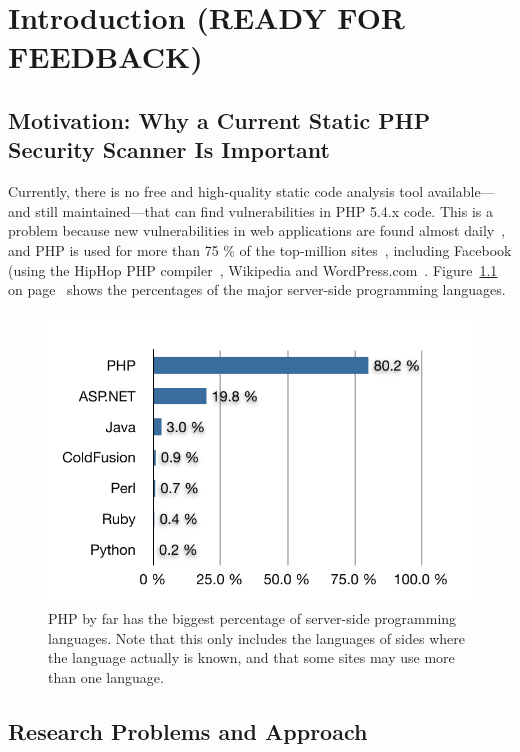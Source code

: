 \chapter{Introduction (READY FOR FEEDBACK)}

\section{Motivation: Why a Current Static PHP Security Scanner Is Important}
Currently, there is no free and high-quality static code analysis tool available---and still maintained---that can find vulnerabilities in PHP 5.4.x code. This is a problem because new vulnerabilities in web applications are found almost daily~\cite{osvdb}, and PHP is used for more than 75 \% of the top-million sites~\cite{w3techs-php-usage}, including Facebook (using the HipHop PHP compiler~\cite{hiphop}, Wikipedia and WordPress.com~\cite{w3techs-php-sites}. Figure~\ref{fig:php-percentage} on page~\pageref{fig:php-percentage} shows the percentages of the major server-side programming languages.

\begin{figure}[htb]
  \begin{center}
    \includegraphics[scale=1.0]{images/language-percentage}
    \caption{PHP by far has the biggest percentage of server-side programming languages. Note that this only includes the languages of sides where the language actually is known, and that some sites may use more than one language.}
    \label{fig:php-percentage}
  \end{center}
\end{figure}


\section{Research Problems and Approach}

